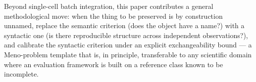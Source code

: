 

Beyond single-cell batch integration, this paper contributes a general methodological move: when the thing to be preserved is by construction unnamed, replace the semantic criterion (does the object have a name?) with a syntactic one (is there reproducible structure across independent observations?), and calibrate the syntactic criterion under an explicit exchangeability bound --- a Meno-problem template that is, in principle, transferable to any scientific domain where an evaluation framework is built on a reference class known to be incomplete.



